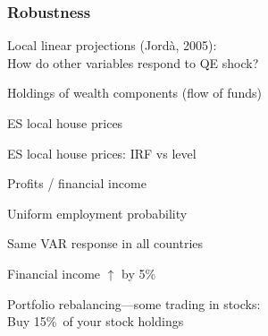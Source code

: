 \documentclass[pdflatex,aspectratio=169]{beamer}
\newcommand{\jemph}[1]{{\color{StataDarkBlue}#1}}
\begin{document}
\begin{frame}\frametitle{\bf Robustness \hypertarget{Robust}{}}

\bi
\item \jemph{Local linear projections (Jord\`a, 2005):}\\ How do other variables respond to QE shock?
\bi
\item  Holdings of wealth components (flow of funds) \hyperlink{FoF}{\beamergotobutton{}}
\item ES local house prices \hyperlink{ESlocalHP}{\beamergotobutton{}}
\item ES local house prices: IRF vs level \hyperlink{ESlocalHPlevel}{\beamergotobutton{}}
\item Profits / financial income \hyperlink{finInc}{\beamergotobutton{}}
\ei
\item Uniform employment probability \hyperlink{UniformEmpProb}{\beamergotobutton{}}
\item Same VAR response in all countries \hyperlink{SameXC}{\beamergotobutton{}}
\item Financial income $\uparrow$ by 5\% \hyperlink{FinInc}{\beamergotobutton{}}
\item Portfolio rebalancing---some trading in stocks:\\ Buy 15\%\ of your stock holdings \hyperlink{StockBoost}{\beamergotobutton{}}
\ei
\end{frame}



\end{document}
